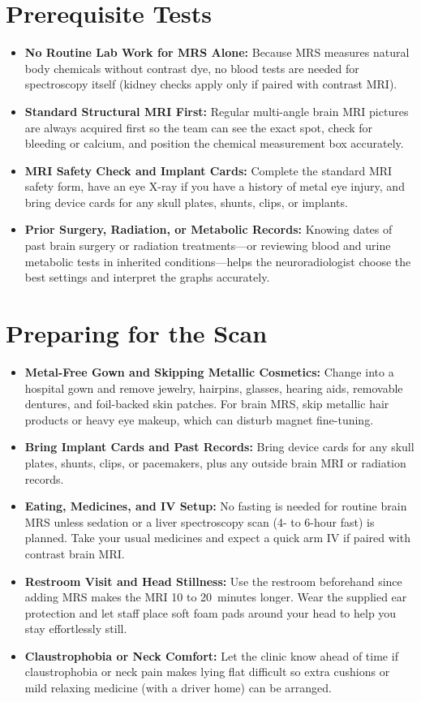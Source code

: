 \section{Prerequisite Tests}
\begin{itemize}
\item \textbf{No Routine Lab Work for MRS Alone:} Because MRS measures natural body chemicals without contrast dye, no blood tests are needed for spectroscopy itself (kidney checks apply only if paired with contrast MRI).
\item \textbf{Standard Structural MRI First:} Regular multi-angle brain MRI pictures are always acquired first so the team can see the exact spot, check for bleeding or calcium, and position the chemical measurement box accurately.
\item \textbf{MRI Safety Check and Implant Cards:} Complete the standard MRI safety form, have an eye X-ray if you have a history of metal eye injury, and bring device cards for any skull plates, shunts, clips, or implants.
\item \textbf{Prior Surgery, Radiation, or Metabolic Records:} Knowing dates of past brain surgery or radiation treatments---or reviewing blood and urine metabolic tests in inherited conditions---helps the neuroradiologist choose the best settings and interpret the graphs accurately.
\end{itemize}

\section{Preparing for the Scan}
\begin{itemize}
\item \textbf{Metal-Free Gown and Skipping Metallic Cosmetics:} Change into a hospital gown and remove jewelry, hairpins, glasses, hearing aids, removable dentures, and foil-backed skin patches. For brain MRS, skip metallic hair products or heavy eye makeup, which can disturb magnet fine-tuning.
\item \textbf{Bring Implant Cards and Past Records:} Bring device cards for any skull plates, shunts, clips, or pacemakers, plus any outside brain MRI or radiation records.
\item \textbf{Eating, Medicines, and IV Setup:} No fasting is needed for routine brain MRS unless sedation or a liver spectroscopy scan (4- to 6-hour fast) is planned. Take your usual medicines and expect a quick arm IV if paired with contrast brain MRI.
\item \textbf{Restroom Visit and Head Stillness:} Use the restroom beforehand since adding MRS makes the MRI 10 to 20~minutes longer. Wear the supplied ear protection and let staff place soft foam pads around your head to help you stay effortlessly still.
\item \textbf{Claustrophobia or Neck Comfort:} Let the clinic know ahead of time if claustrophobia or neck pain makes lying flat difficult so extra cushions or mild relaxing medicine (with a driver home) can be arranged.
\end{itemize}

